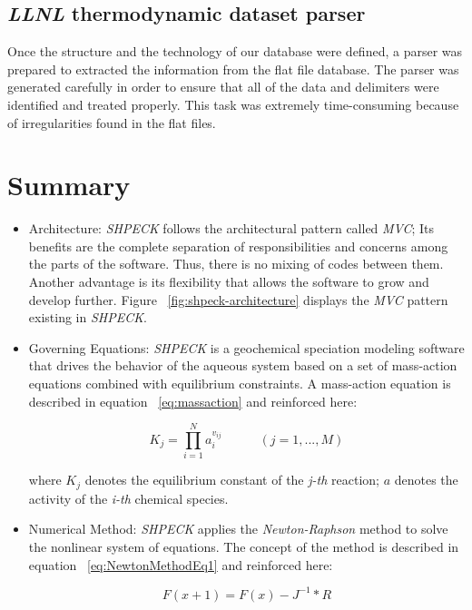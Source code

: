 \subsection{\emph{LLNL} thermodynamic dataset parser}
Once the structure and the technology of our database were defined, a parser was prepared to extracted the information from the flat file database. 
The parser was generated carefully in order to ensure that all of the data and delimiters were identified and treated properly. This task was extremely time-consuming because of irregularities found in the flat files.

\newpage

\section{Summary}
\begin{itemize}
\item Architecture: \emph{SHPECK} follows the architectural pattern called \emph{MVC}; Its benefits are the complete separation of responsibilities and concerns among the parts of the software. Thus, there is no mixing of codes between them. Another advantage is its flexibility that allows the software to grow and develop further. Figure ~\ref{fig:shpeck-architecture} displays the \emph{MVC} pattern existing in \emph{SHPECK}.
\item Governing Equations: \emph{SHPECK} is a geochemical speciation modeling software that drives the behavior of the aqueous system based on a set of mass-action equations combined with equilibrium constraints. A mass-action equation is described in equation  ~\ref{eq:massaction} and reinforced here:

\begin{equation}
K_j =  \prod\limits_{i=1}^N  a_i^{v_{ij}} \hspace{35pt}    (j = 1, ... , M)
\end{equation}

where $K_j$ denotes the equilibrium constant of the \emph{j-th} reaction; $a$ denotes the activity of the \emph{i-th} chemical species.

\item Numerical Method: \emph{SHPECK} applies the \emph{Newton-Raphson} method to solve the nonlinear system of equations. The concept of the method is described in equation ~\ref{eq:NewtonMethodEq1} and reinforced here:

\begin{equation}
F(x+1) = F(x) - J^{-1} * R
\end{equation}


\end{itemize}
